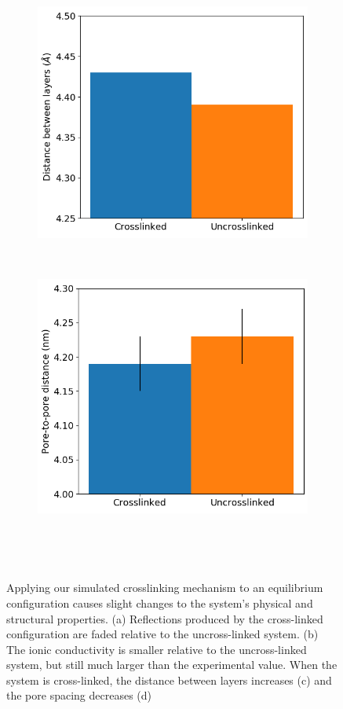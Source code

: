 \documentclass{article}
\begin{document}
\begin{figure}
\begin{subfigure}{0.45\textwidth}
	\includegraphics[width=\textwidth]{dbwl_xlink.png}
	\caption{}~\label{fig:dbwl_xlink}
  \end{subfigure}
  \begin{subfigure}{0.45\textwidth}
	\centering
	\includegraphics[width=\textwidth]{p2p_xlink.png}
	\caption{}~\label{fig:p2p_xlink}
  \end{subfigure}
  \caption{Applying our simulated crosslinking mechanism to an equilibrium
	  configuration causes slight changes to the system's physical and structural
	  properties. (a) Reflections produced by the cross-linked configuration are
	  faded relative to the uncross-linked system. (b) The ionic conductivity is
	  smaller relative to the uncross-linked system, but still much larger than the
	  experimental value. When the system is cross-linked, the distance between
	  layers increases (c) and the pore spacing decreases (d)}~\label{fig:xlink}
  \end{figure}
 
\end{document}
